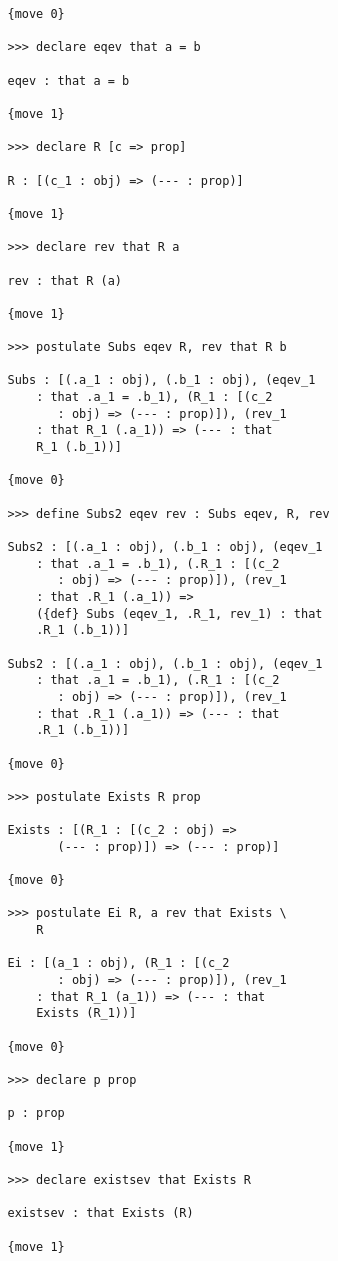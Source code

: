 \documentclass[12pt]{article}
\begin{document}
\begin{enumerate}
\begin{verbatim}
   {move 0}

   >>> declare eqev that a = b

   eqev : that a = b

   {move 1}

   >>> declare R [c => prop]

   R : [(c_1 : obj) => (--- : prop)]

   {move 1}

   >>> declare rev that R a

   rev : that R (a)

   {move 1}

   >>> postulate Subs eqev R, rev that R b

   Subs : [(.a_1 : obj), (.b_1 : obj), (eqev_1 
       : that .a_1 = .b_1), (R_1 : [(c_2 
          : obj) => (--- : prop)]), (rev_1 
       : that R_1 (.a_1)) => (--- : that 
       R_1 (.b_1))]

   {move 0}

   >>> define Subs2 eqev rev : Subs eqev, R, rev

   Subs2 : [(.a_1 : obj), (.b_1 : obj), (eqev_1 
       : that .a_1 = .b_1), (.R_1 : [(c_2 
          : obj) => (--- : prop)]), (rev_1 
       : that .R_1 (.a_1)) => 
       ({def} Subs (eqev_1, .R_1, rev_1) : that 
       .R_1 (.b_1))]

   Subs2 : [(.a_1 : obj), (.b_1 : obj), (eqev_1 
       : that .a_1 = .b_1), (.R_1 : [(c_2 
          : obj) => (--- : prop)]), (rev_1 
       : that .R_1 (.a_1)) => (--- : that 
       .R_1 (.b_1))]

   {move 0}

   >>> postulate Exists R prop

   Exists : [(R_1 : [(c_2 : obj) => 
          (--- : prop)]) => (--- : prop)]

   {move 0}

   >>> postulate Ei R, a rev that Exists \
       R

   Ei : [(a_1 : obj), (R_1 : [(c_2 
          : obj) => (--- : prop)]), (rev_1 
       : that R_1 (a_1)) => (--- : that 
       Exists (R_1))]

   {move 0}

   >>> declare p prop

   p : prop

   {move 1}

   >>> declare existsev that Exists R

   existsev : that Exists (R)

   {move 1}


\end{verbatim}
\end{enumerate}
\end{document}
